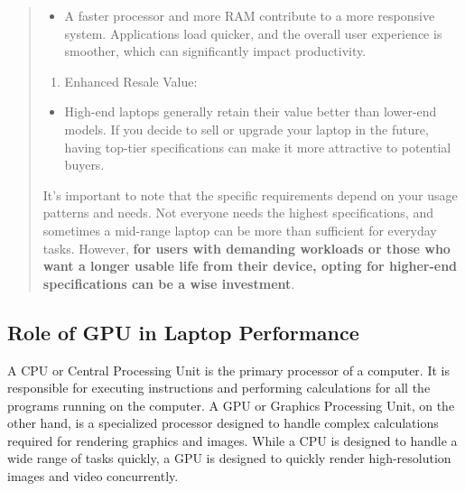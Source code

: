 \begin{leftbar}
\begin{quote}
\begin{itemize}

\item
A faster processor and more RAM contribute to a more responsive system. Applications load quicker, and the overall user experience is smoother, which can significantly impact productivity.
\end{itemize}

\begin{enumerate}[leftmargin=*]
\def\labelenumi{\arabic{enumi}.}
\setcounter{enumi}{7}

\item
Enhanced Resale Value:
\end{enumerate}

\begin{itemize}

\item
High-end laptops generally retain their value better than lower-end models. If you decide to sell or upgrade your laptop in the future, having top-tier specifications can make it more attractive to potential buyers.
\end{itemize}

It's important to note that the specific requirements depend on your usage patterns and needs. Not everyone needs the highest specifications, and sometimes a mid-range laptop can be more than sufficient for everyday tasks. However, \textbf{for users with demanding workloads or those who want a longer usable life from their device, opting for higher-end specifications can be a wise investment}.
\end{quote}\end{leftbar}

\pagebreak	\hypertarget{gpu-needs}{}\subsection{Role of GPU in Laptop Performance}\label{gpu-needs}
A CPU or Central Processing Unit is the primary processor of a computer. It is responsible for executing instructions and performing calculations for all the programs running on the computer. A GPU or Graphics Processing Unit, on the other hand, is a specialized processor designed to handle complex calculations required for rendering graphics and images. While a CPU is designed to handle a wide range of tasks quickly, a GPU is designed to quickly render high-resolution images and video concurrently.

